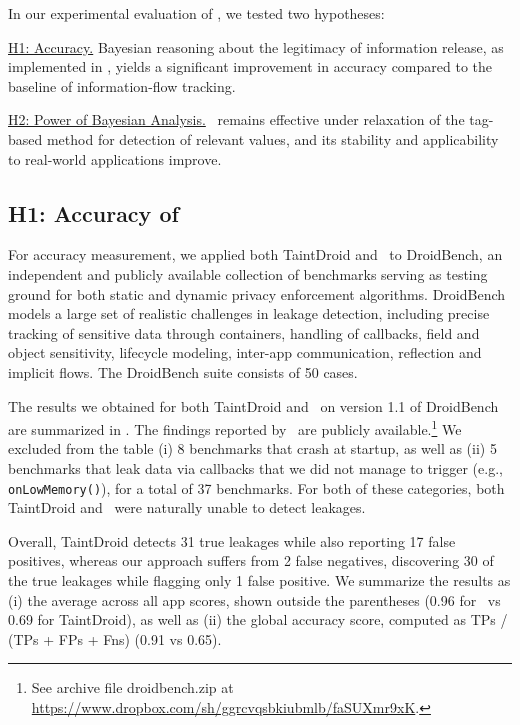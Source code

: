 In our experimental evaluation of \Tool, we tested two hypotheses:
\begin{compactenum}
	\item \underline{H1: Accuracy.} Bayesian reasoning about the legitimacy of information release, as implemented in \Tool, yields a significant improvement in accuracy compared to the baseline of 
	information-flow tracking.
	\item \underline{H2: Power of Bayesian Analysis.} \Tool\ remains effective under relaxation of the tag-based method for detection of relevant values, and its stability and applicability to real-world applications improve.
\end{compactenum}

\subsection{H1: Accuracy of \Tool}\label{Se:overhead}

For accuracy measurement, we applied both TaintDroid and \Tool\ to DroidBench, an independent and publicly available collection of benchmarks serving as testing ground for both static and dynamic privacy enforcement algorithms. DroidBench models a large set of realistic challenges in leakage detection, including precise tracking of sensitive data through containers, handling of callbacks, field and object sensitivity, lifecycle modeling, inter-app communication, reflection and implicit flows. The DroidBench suite consists of 50 cases.

The results we obtained for both TaintDroid and \Tool\ on version 1.1 of DroidBench are summarized in . The findings reported by \Tool\ are publicly available.\footnote{
	See archive file droidbench.zip at \href{https://www.dropbox.com/sh/ggrcvqsbkiubmlb/faSUXmr9xK}{https://www.dropbox.com/sh/ggrcvqsbkiubmlb/faSUXmr9xK}.
} We excluded from the table (i) 8 benchmarks that crash at startup, as well as (ii) 5 benchmarks that leak data via callbacks that we did not manage to trigger (e.g., {\tt onLowMemory()}), for a total of 37 benchmarks. For both of these categories, both TaintDroid and \Tool\ were naturally unable to detect leakages.

Overall, TaintDroid detects 31 true leakages while also reporting 17 false positives, whereas our approach suffers from 2 false negatives, discovering 30 of the true leakages while flagging only 1 false positive. We summarize the results as (i) the average across all app scores, shown outside the parentheses (0.96 for \Tool\ vs 0.69 for TaintDroid), as well as (ii) the global accuracy score, computed as TPs / (TPs + FPs + Fns) (0.91 vs 0.65).

